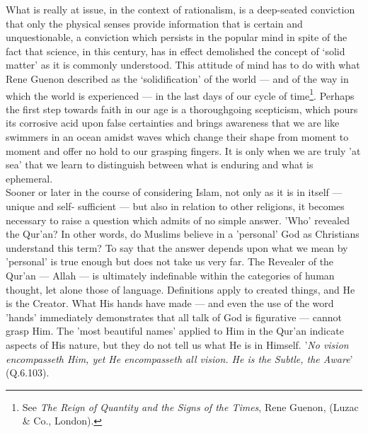 \documentclass[10pt, twoside,openright]{book}
\begin{document}
What is really at issue, in the context of rationalism, is a deep\hyp{}seated conviction that only the 
physical senses provide information that is certain and unquestionable, a conviction which persists 
in the popular mind in spite of the fact that science, in this century, has in effect demolished the 
concept of `solid matter' as it is commonly understood. This attitude of mind has to do with what 
Rene Guenon described as the `solidification' of the world --- and of the way in which the world is 
experienced --- in the last days of our cycle of time\footnote{See \emph{The Reign of Quantity and the Signs of the Times}, Rene Guenon, (Luzac \& Co., London).}. Perhaps the first step towards faith in our 
age is a thoroughgoing scepticism, which pours its corrosive acid upon false certainties and brings 
awareness that we are like swimmers in an ocean amidst waves which change their shape from moment to moment and offer no hold to our grasping fingers. It is only when we are truly 'at sea' that we learn 
to distinguish between what is enduring and what is ephemeral. \\

Sooner or later in the course of considering Islam, not only as it is in itself --- unique and self-
sufficient --- but also in relation to other religions, it becomes necessary to raise a question which 
admits of no simple answer. 'Who' revealed the Qur'an? In other words, do Muslims believe in a 
'personal' God as Christians understand this term? To say that the answer depends upon what we mean 
by 'personal' is true enough but does not take us very far. The Revealer of the Qur'an --- Allah --- is 
ultimately indefinable within the categories of human thought, let alone those of language. 
Definitions apply to created things, and He is the Creator. What His hands have made --- and even the 
use of the word 'hands' immediately demonstrates that all talk of God is figurative --- cannot grasp 
Him. The 'most beautiful names' applied to Him in the Qur'an indicate aspects of His nature, but they 
do not tell us what He is in Himself. '\emph{No vision encompasseth Him, yet He encompasseth all vision. He is the Subtle, the Aware}' (Q.6.103). \\
\end{document}
